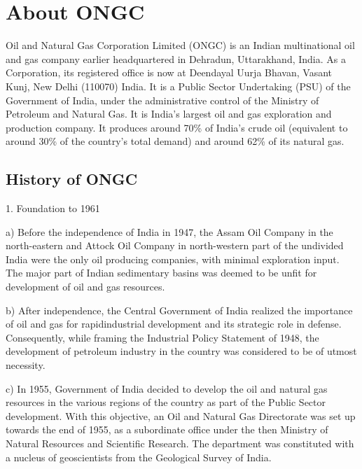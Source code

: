 \chapter{About ONGC}


Oil and Natural Gas Corporation Limited (ONGC) is an Indian multinational oil and gas company earlier headquartered in Dehradun, Uttarakhand, India. As a Corporation, its registered office is now at Deendayal Uurja Bhavan, Vasant Kunj, New Delhi (110070) India. It is a Public Sector Undertaking (PSU) of the
Government of India, under the administrative control of the Ministry of Petroleum and Natural Gas. It is India's largest oil and gas exploration and production company. It produces around 70\% of India's crude oil (equivalent to around 30\% of the country's total demand) and around 62\% of its natural gas.

\section{History of ONGC}

1. Foundation to 1961

a) Before the independence of India in 1947, the Assam Oil Company in the north-eastern and Attock Oil Company in north-western part of the undivided India
were the only oil producing companies, with minimal exploration input. The major part of Indian sedimentary basins was deemed to be unfit for development of oil
and gas resources.

b) After independence, the Central Government of India realized the importance of oil and gas for rapidindustrial development and its strategic role in defense.
Consequently, while framing the Industrial Policy Statement of 1948, the development of petroleum industry in the country was considered to be of utmost
necessity.

c) In 1955, Government of India decided to develop the oil and natural gas resources in the various regions of the country as part of the Public Sector development. With this objective, an Oil and Natural Gas Directorate was set up towards the end of 1955, as a subordinate office under the then Ministry of Natural Resources and
Scientific Research. The department was constituted with a nucleus of geoscientists from the Geological Survey of India.

